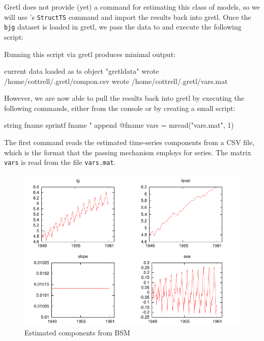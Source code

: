 Gretl does not provide (yet) a command for estimating this class
of models, so we will use 's \texttt{StructTS} command and
import the results back into gretl. Once the \texttt{bjg}
dataset is loaded in gretl, we pass the data to  and execute
the following script:

Running this script via gretl produces minimal output:
\begin{code}
current data loaded as ts object "gretldata"
wrote /home/cottrell/.gretl/compon.csv 
wrote /home/cottrell/.gretl/vars.mat 
\end{code}
However, we are now able to pull the results back into gretl by
executing the following commands, either from the console or by
creating a small script:
\begin{code}
string fname 
sprintf fname "%
append @fname
vars = mread("vars.mat", 1)
\end{code}
The first command reads the estimated time-series components from a
CSV file, which is the format that the passing mechanism employs for
series. The matrix \texttt{vars} is read from the file
\texttt{vars.mat}.

\begin{figure}[htbp]
  \centering
  \includegraphics{figures/BSM-output}
  \caption{Estimated components from BSM}
  \label{fig:BSM-output}
\end{figure}

